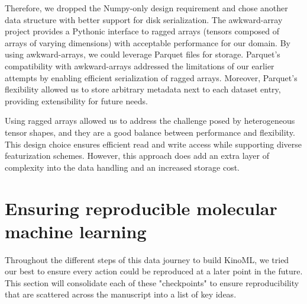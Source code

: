\documentclass[9pt,lessons]{livecoms}
\newcommand{\revision}[1]{\textcolor{black}{#1}}
\begin{document}
Therefore, we dropped the Numpy-only design requirement and chose another data structure with better support for disk serialization. The awkward-array project \revision{\cite{pivarski2020awkward}} provides a Pythonic interface to ragged arrays (tensors composed of arrays of varying dimensions) with acceptable performance for our domain. By using awkward-arrays, we could leverage Parquet files for storage. Parquet's compatibility with awkward-arrays addressed the limitations of our earlier attempts by enabling efficient serialization of ragged arrays. Moreover, Parquet's flexibility allowed us to store arbitrary metadata next to each dataset entry, providing extensibility for future needs.

Using ragged arrays allowed us to address the challenge posed by heterogeneous tensor shapes, and they are a good balance between performance and flexibility. This design choice ensures efficient read and write access while supporting diverse featurization schemes. However, this approach does add an extra layer of complexity into the data handling and an increased storage cost.



\section{Ensuring reproducible molecular machine learning}

Throughout the different steps of this data journey to build KinoML, we tried our best to ensure every action could be reproduced at a later point in the future. This section will consolidate each of these "checkpoints" to ensure reproducibility that are scattered across the manuscript into a list of key ideas.
\end{document}
